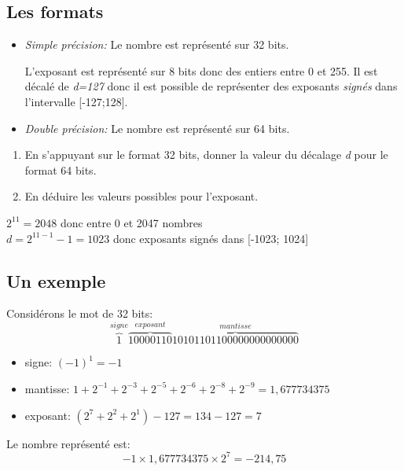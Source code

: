\documentclass[a4paper,11pt]{article}
\begin{document}
\begin{Form}
\subsection{Les formats}
\begin{itemize}
\item \emph{Simple précision:} Le nombre est représenté sur 32 bits.
\begin{center}
\end{center}
L'exposant est représenté sur 8 bits donc des entiers entre 0 et 255. Il est décalé de \emph{d=127} donc il est possible de représenter des exposants \emph{signés} dans l'intervalle [-127;128].
\item \emph{Double précision:} Le nombre est représenté sur 64 bits.
\begin{center}
\end{center}
\end{itemize}
\begin{activite}
\begin{enumerate}
\item En s'appuyant sur le format 32 bits, donner la valeur du décalage \emph{d} pour le format 64 bits.
\item En déduire les valeurs possibles pour l'exposant.
\end{enumerate}
\begin{commentprof}
$2^{11} = 2048$ donc entre 0 et 2047 nombres\\
$d = 2^{11-1}-1=1023$ donc exposants signés dans [-1023; 1024]
\end{commentprof}
\end{activite}
\subsection{Un exemple}
Considérons le mot de 32 bits:
$$\overbrace{1}^{signe}\overbrace{10000110}^{exposant}\overbrace{10101101100000000000000}^{mantisse}$$
\begin{itemize}
\item signe: $(-1)^1=-1$
\item mantisse: $1+2^{-1}+2^{-3}+2^{-5}+2^{-6}+2^{-8}+2^{-9} = 1,677734375$
\item exposant: $(2^7+2^2+2^1)-127=134-127=7$
\end{itemize}
Le nombre représenté est:
$$-1×1,677734375×2^7=-214,75$$

\end{Form}
\end{document}

